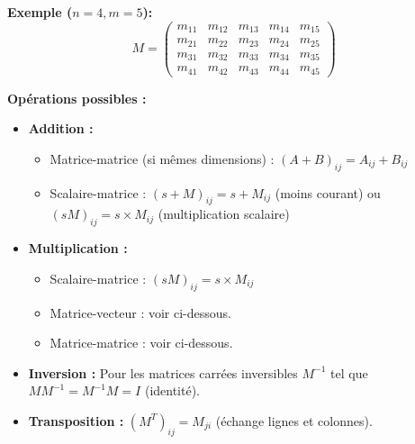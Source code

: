 \documentclass{article}
\begin{document}
\textbf{Exemple ($n=4, m=5$):}
\[ M =
\begin{pmatrix}
m_{11} & m_{12} & m_{13} & m_{14} & m_{15} \\
m_{21} & m_{22} & m_{23} & m_{24} & m_{25} \\
m_{31} & m_{32} & m_{33} & m_{34} & m_{35} \\
m_{41} & m_{42} & m_{43} & m_{44} & m_{45}
\end{pmatrix}
\]

\textbf{Opérations possibles :}
\begin{itemize}
    \item \textbf{Addition :}
    \begin{itemize}
        \item Matrice-matrice (si mêmes dimensions) : $(A+B)_{ij} = A_{ij} + B_{ij}$
        \item Scalaire-matrice : $(s+M)_{ij} = s + M_{ij}$ (moins courant) ou $(sM)_{ij} = s \times M_{ij}$ (multiplication scalaire)
    \end{itemize}
    \item \textbf{Multiplication :}
    \begin{itemize}
        \item Scalaire-matrice : $(sM)_{ij} = s \times M_{ij}$
        \item Matrice-vecteur : voir ci-dessous.
        \item Matrice-matrice : voir ci-dessous.
    \end{itemize}
    \item \textbf{Inversion :} Pour les matrices carrées inversibles $M^{-1}$ tel que $M M^{-1} = M^{-1} M = I$ (identité).
    \item \textbf{Transposition :} $(M^T)_{ij} = M_{ji}$ (échange lignes et colonnes).
\end{itemize}
\end{document}
